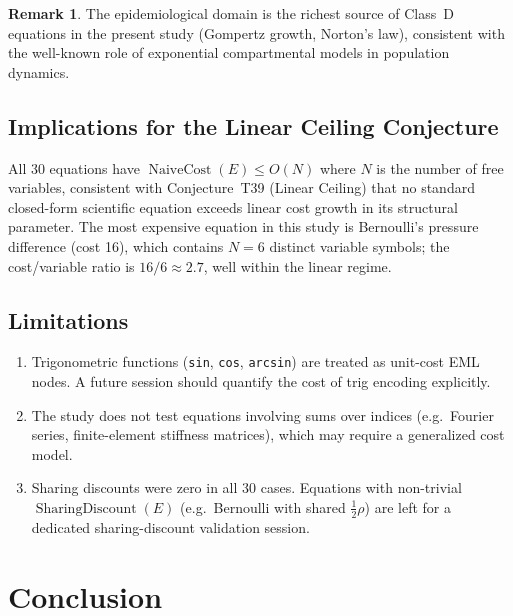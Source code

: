 \documentclass[12pt,a4paper]{article}
\theoremstyle{definition}
\newtheorem{remark}[theorem]{Remark}
\newcommand{\NC}{\operatorname{NaiveCost}}
\newcommand{\SD}{\operatorname{SharingDiscount}}
\begin{document}
\begin{remark}
The epidemiological domain is the richest source of Class~D equations in
the present study (Gompertz growth, Norton's law), consistent with the
well-known role of exponential compartmental models in population dynamics.
\end{remark}

\subsection{Implications for the Linear Ceiling Conjecture}

All 30 equations have $\NC(E) \leq O(N)$ where $N$ is the number of
free variables, consistent with Conjecture~T39 (Linear Ceiling) that no
standard closed-form scientific equation exceeds linear cost growth in its
structural parameter.
The most expensive equation in this study is Bernoulli's pressure difference
(cost 16), which contains $N=6$ distinct variable symbols; the cost/variable
ratio is $16/6 \approx 2.7$, well within the linear regime.

\subsection{Limitations}

\begin{enumerate}
  \item Trigonometric functions (\texttt{sin}, \texttt{cos}, \texttt{arcsin})
        are treated as unit-cost EML nodes.
        A future session should quantify the cost of trig encoding explicitly.
  \item The study does not test equations involving sums over indices
        (e.g.\ Fourier series, finite-element stiffness matrices),
        which may require a generalized cost model.
  \item Sharing discounts were zero in all 30 cases.
        Equations with non-trivial $\SD(E)$ (e.g.\ Bernoulli with shared
        $\tfrac{1}{2}\rho$) are left for a dedicated sharing-discount
        validation session.
\end{enumerate}

\section{Conclusion}
\label{sec:conclusion}
\end{document}
